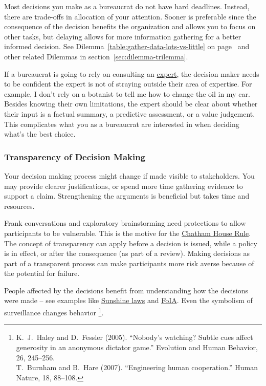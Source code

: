 Most decisions you make as a bureaucrat do not have hard deadlines. Instead, there are trade-offs in allocation of your attention. Sooner is preferable since the consequence of the decision benefits the organization and allows you to focus on other tasks, but delaying allows for more information gathering for a better informed decision. See 
Dilemma~\ref{table:gather-data-lots-vs-little} on 
page~\pageref{table:gather-data-lots-vs-little} 
and other related Dilemmas in section~\ref{sec:dilemma-trilemma}.


If a bureaucrat is going to rely on consulting an
\hyperref[sec:expertise]{expert},
the decision maker needs to be confident the expert is not of straying outside their area of expertise. For example, I don't rely on a botanist  to tell me how to change the oil in my car. 
Besides knowing their own limitations, the expert should be clear about whether their input is a factual summary, a predictive assessment, or a value judgement. This complicates what you as a bureaucrat are interested in when deciding what's the best choice.


\subsubsection{Transparency of Decision Making\label{sec:transparency-of-decisions}}

Your decision making process might change if made visible to stakeholders. You may provide clearer justifications, or spend more time gathering evidence to support a claim. Strengthening the arguments is beneficial but takes time and resources. 

Frank conversations and exploratory brainstorming need protections to allow participants to be vulnerable. 
This is the motive for the \href{https://en.wikipedia.org/wiki/Chatham_House_Rule}{Chatham House Rule}. 
The concept of transparency can apply before a decision is issued, while a policy is in effect, or after the consequence (as part of a review). 
Making decisions as part of a transparent process can make participants more risk averse because of the potential for failure.

People affected by the decisions benefit from understanding how the decisions were made -- see examples like 
\href{https://en.wikipedia.org/wiki/Government_in_the_Sunshine_Act}{Sunshine laws} and \href{https://en.wikipedia.org/wiki/Freedom_of_Information_Act_(United_States)}{FoIA}. Even the symbolism of surveillance changes behavior
\footnote{K.~J.~Haley and D.~Fessler (2005). ``Nobody’s watching? Subtle cues affect generosity in an anonymous dictator game.'' Evolution and Human Behavior, 26, 245–256.\\
T.~Burnham and B.~Hare (2007). ``Engineering human cooperation.'' Human Nature, 18, 88–108.}.



